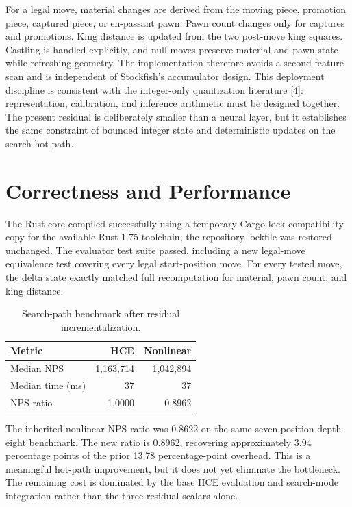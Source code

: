 \documentclass[conference]{IEEEtran}
\begin{document}
For a legal move, material changes are derived from the moving piece, promotion piece, captured piece, or en-passant pawn. Pawn count changes only for captures and promotions. King distance is updated from the two post-move king squares. Castling is handled explicitly, and null moves preserve material and pawn state while refreshing geometry. The implementation therefore avoids a second feature scan and is independent of Stockfish's accumulator design. This deployment discipline is consistent with the integer-only quantization literature [4]: representation, calibration, and inference arithmetic must be designed together. The present residual is deliberately smaller than a neural layer, but it establishes the same constraint of bounded integer state and deterministic updates on the search hot path.

\section{Correctness and Performance}
The Rust core compiled successfully using a temporary Cargo-lock compatibility copy for the available Rust 1.75 toolchain; the repository lockfile was restored unchanged. The evaluator test suite passed, including a new legal-move equivalence test covering every legal start-position move. For every tested move, the delta state exactly matched full recomputation for material, pawn count, and king distance.

\begin{table}[t]
\centering
\caption{Search-path benchmark after residual incrementalization.}
\begin{tabular}{lrr}
\toprule
Metric & HCE & Nonlinear \\
\midrule
Median NPS & 1,163,714 & 1,042,894 \\
Median time (ms) & 37 & 37 \\
NPS ratio & 1.0000 & 0.8962 \\
\bottomrule
\end{tabular}
\end{table}

The inherited nonlinear NPS ratio was 0.8622 on the same seven-position depth-eight benchmark. The new ratio is 0.8962, recovering approximately 3.94 percentage points of the prior 13.78 percentage-point overhead. This is a meaningful hot-path improvement, but it does not yet eliminate the bottleneck. The remaining cost is dominated by the base HCE evaluation and search-mode integration rather than the three residual scalars alone.
\end{document}
